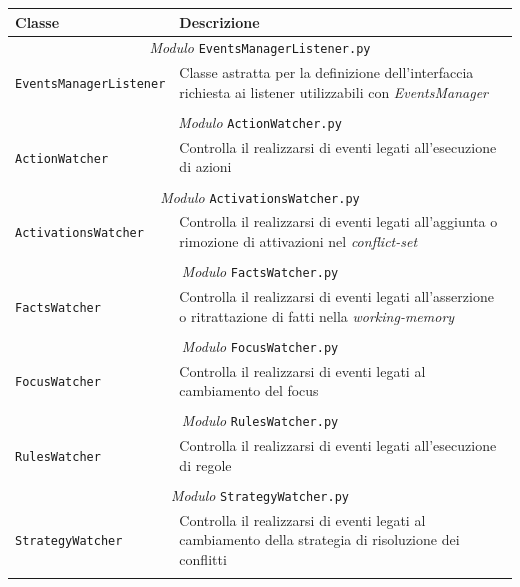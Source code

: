\begin{longtable}{p{5.5cm}p{6.5cm}}
\hline 
\textbf{Classe} & \textbf{Descrizione} \\ 
\hline\hline 
\endhead

\multicolumn{2}{c}{\emph{Modulo} \texttt{EventsManagerListener.py}}\\
	\hdashline[5pt/5pt]
		\texttt{EventsManagerListener} & Classe astratta per la definizione dell'interfaccia richiesta ai listener utilizzabili con \emph{EventsManager} \\ 
	\hline\\

\multicolumn{2}{c}{\emph{Modulo} \texttt{ActionWatcher.py}}\\
	\hdashline[5pt/5pt]
		\texttt{ActionWatcher} & Controlla il realizzarsi di eventi legati all'esecuzione di azioni \\ 
	\hline\\

\multicolumn{2}{c}{\emph{Modulo} \texttt{ActivationsWatcher.py}}\\
	\hdashline[5pt/5pt]
		\texttt{ActivationsWatcher} & Controlla il realizzarsi di eventi legati all'aggiunta o rimozione di attivazioni nel \emph{conflict-set} \\ 
	\hline\\

\multicolumn{2}{c}{\emph{Modulo} \texttt{FactsWatcher.py}}\\
	\hdashline[5pt/5pt]
		\texttt{FactsWatcher} & Controlla il realizzarsi di eventi legati all'asserzione o ritrattazione di fatti nella \emph{working-memory} \\ 
	\hline\\

\multicolumn{2}{c}{\emph{Modulo} \texttt{FocusWatcher.py}}\\
	\hdashline[5pt/5pt]
		\texttt{FocusWatcher} & Controlla il realizzarsi di eventi legati al cambiamento del focus \\ 
	\hline\\

\multicolumn{2}{c}{\emph{Modulo} \texttt{RulesWatcher.py}}\\
	\hdashline[5pt/5pt]
		\texttt{RulesWatcher} & Controlla il realizzarsi di eventi legati all'esecuzione di regole \\ 
	\hline\\
	
\multicolumn{2}{c}{\emph{Modulo} \texttt{StrategyWatcher.py}}\\
	\hdashline[5pt/5pt]
		\texttt{StrategyWatcher} & Controlla il realizzarsi di eventi legati al cambiamento della strategia di risoluzione dei conflitti \\ 
	\hline\\


\end{longtable}
